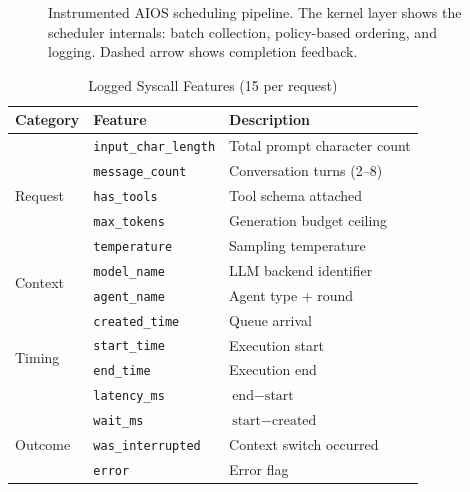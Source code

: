 \documentclass[conference]{IEEEtran}
\begin{document}
\begin{figure}[htbp]
{%
}
\caption{Instrumented AIOS scheduling pipeline. The kernel layer shows the scheduler internals: batch collection, policy-based ordering, and logging. Dashed arrow shows completion feedback.}
\label{fig:architecture}
\end{figure}

\begin{table}[htbp]
\caption{Logged Syscall Features (15 per request)}
\begin{center}
\begin{tabular}{llp{3.2cm}}
\toprule
\textbf{Category} & \textbf{Feature} & \textbf{Description} \\
\midrule
\multirow{5}{*}{Request} & \texttt{input\_char\_length} & Total prompt character count \\
& \texttt{message\_count} & Conversation turns (2--8) \\
& \texttt{has\_tools} & Tool schema attached \\
& \texttt{max\_tokens} & Generation budget ceiling \\
& \texttt{temperature} & Sampling temperature \\
\midrule
\multirow{2}{*}{Context} & \texttt{model\_name} & LLM backend identifier \\
& \texttt{agent\_name} & Agent type + round \\
\midrule
\multirow{4}{*}{Timing} & \texttt{created\_time} & Queue arrival \\
& \texttt{start\_time} & Execution start \\
& \texttt{end\_time} & Execution end \\
& \texttt{latency\_ms} & $\text{end} - \text{start}$ \\
\midrule
\multirow{3}{*}{Outcome} & \texttt{wait\_ms} & $\text{start} - \text{created}$ \\
& \texttt{was\_interrupted} & Context switch occurred \\
& \texttt{error} & Error flag \\
\bottomrule
\end{tabular}
\label{tab:features}
\end{center}
\end{table}
\end{document}
